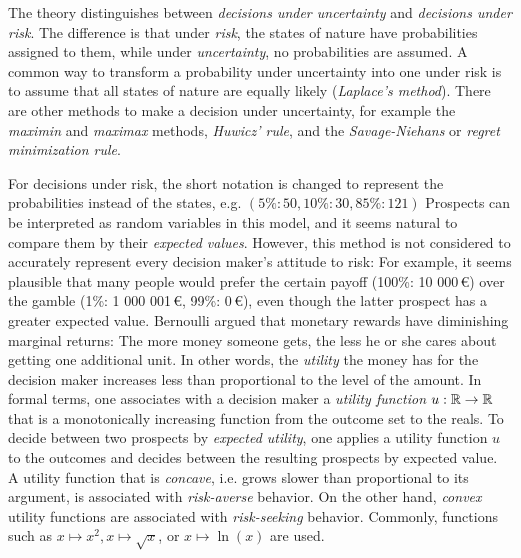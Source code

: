 \documentclass[a4paper,DIV=11]{scrreprt}
\theoremstyle{definition}
\begin{document}
    The theory distinguishes between \emph{decisions under uncertainty} and \emph{decisions under risk}. The difference is that under \emph{risk}, the states of nature have probabilities assigned to them, while under \emph{uncertainty}, no probabilities are assumed.
    A common way to transform a probability under uncertainty into one under risk is to assume that all states of nature are equally likely (\emph{Laplace's method}).
    There are other methods to make a decision under uncertainty, for example the \emph{maximin} and \emph{maximax} methods, \emph{Huwicz' rule}, and the \emph{Savage-Niehans} or \emph{regret minimization rule}. \cite[Section 4]{bib:doersamGrundlagenDerEntscheidungstheorie}
    
    For decisions under risk, the short notation is changed to represent the probabilities instead of the states, e.g. $(5\%: 50, 10\%: 30, 85\%: 121)$
    Prospects can be interpreted as random variables in this model, and it seems natural to compare them by their \emph{expected values}. However, this method is not considered to accurately represent every decision maker's attitude to risk:
    For example, it seems plausible that many people would prefer the certain payoff (100\%: 10 000\,\euro) over the gamble (1\%:  1 000 001\,\euro, 99\%:  0\,\euro), even though the latter prospect has a greater expected value.
    Bernoulli argued that monetary rewards have diminishing marginal returns: The more money someone gets, the less he or she cares about getting one additional unit. In other words, the \emph{utility} the money has for the decision maker increases less than proportional to the level of the amount.
    In formal terms, one associates with a decision maker a \emph{utility function} $u: \mathbb{R} \to \mathbb{R}$ that is a monotonically increasing function from the outcome set to the reals.
    To decide between two prospects by \emph{expected utility}, one applies a utility function $u$ to the outcomes and decides between the resulting prospects by expected value.
    A utility function that is \emph{concave}, i.e. grows slower than proportional to its argument, is associated with \emph{risk-averse} behavior.
    On the other hand, \emph{convex} utility functions are associated with \emph{risk-seeking} behavior. Commonly, functions such as $x \mapsto x^2, x \mapsto \sqrt{x}$, or $x \mapsto \ln(x)$ are used.
     \cites[Sections 2.1, 2.2]{bib:wakkerProspectTheory}[Section 5]{bib:doersamGrundlagenDerEntscheidungstheorie}
    
\end{document}
